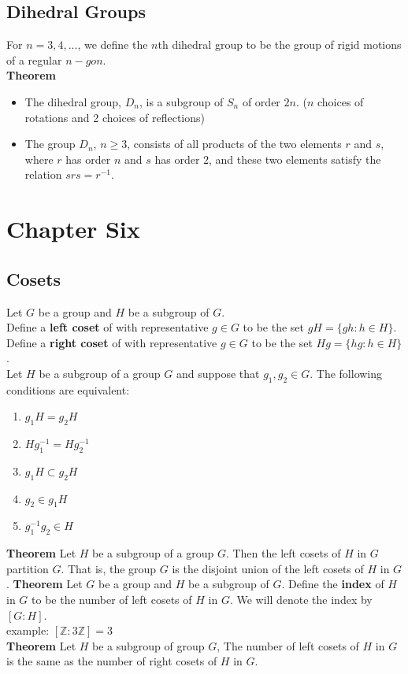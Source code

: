 \documentclass{article}
\begin{document}
\subsection{Dihedral Groups}
For $n=3,4,...$, we define the $n$th dihedral group to be the group of rigid motions of a regular $n-gon$. \\
\textbf{Theorem}
\begin{itemize}
    \item The dihedral group, $D_n$, is a subgroup of $S_n$ of order $2n$. ($n$ choices of rotations and 2 choices of reflections)
    \item The group $D_n$, $n\geq 3$, consists of all products of the two elements $r$ and $s$, where $r$ has order $n$ and $s$ has order $2$, and these two elements satisfy the relation $srs=r^{-1}$.
\end{itemize}

\section{Chapter Six}
\subsection{Cosets}
Let $G$ be a group and $H$ be a subgroup of $G$. \\
Define a \textbf{left coset} of with representative $g\in G$ to be the set $gH=\{gh: h\in H\}$.\\
Define a \textbf{right coset} of with representative $g\in G$ to be the set $Hg=\{hg: h\in H\}$.\\
Let $H$ be a subgroup of a group $G$ and suppose that $g_1,g_2\in G$. The following conditions are equivalent:
\begin{enumerate}
    \item $g_{1}H=g_{2}H$
    \item $Hg^{-1}_{1}=Hg^{-1}_{2}$
    \item $g_{1}H\subset g_{2}H$
    \item $g_{2}\in g_{1}H$
    \item $g_{1}^{-1}g_{2}\in H$
\end{enumerate}
\textbf{Theorem}
Let $H$ be a subgroup of a group $G$. Then the left cosets of $H$ in $G$ partition $G$. That is, the group $G$ is the disjoint union of the left cosets of $H$ in $G$.
\textbf{Theorem}
Let $G$ be a group and $H$ be a subgroup of $G$. Define the \textbf{index} of $H$ in $G$ to be the number of left cosets of $H$ in $G$. We will denote the index by $[G:H]$.\\
example: $[\mathbb{Z}:3\mathbb{Z}]=3$\\
\textbf{Theorem}
Let $H$ be a subgroup of group $G$, The number of left cosets of $H$ in $G$ is the same as the number of right cosets of $H$ in $G$.
\end{document}
